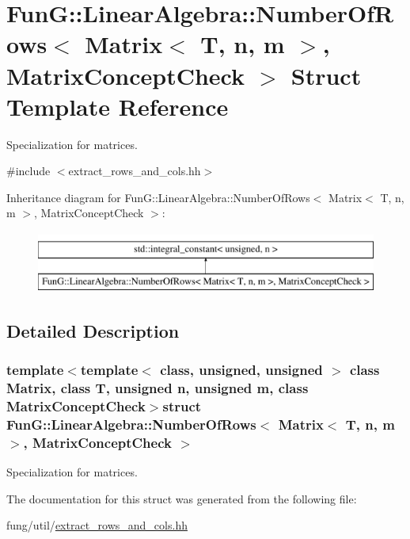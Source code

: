 \hypertarget{structFunG_1_1LinearAlgebra_1_1NumberOfRows_3_01Matrix_3_01T_00_01n_00_01m_01_4_00_01MatrixConceptCheck_01_4}{\section{\-Fun\-G\-:\-:\-Linear\-Algebra\-:\-:\-Number\-Of\-Rows$<$ \-Matrix$<$ \-T, n, m $>$, \-Matrix\-Concept\-Check $>$ \-Struct \-Template \-Reference}
\label{structFunG_1_1LinearAlgebra_1_1NumberOfRows_3_01Matrix_3_01T_00_01n_00_01m_01_4_00_01MatrixConceptCheck_01_4}
}


\-Specialization for matrices.  




{\ttfamily \#include $<$extract\-\_\-rows\-\_\-and\-\_\-cols.\-hh$>$}

\-Inheritance diagram for \-Fun\-G\-:\-:\-Linear\-Algebra\-:\-:\-Number\-Of\-Rows$<$ \-Matrix$<$ \-T, n, m $>$, \-Matrix\-Concept\-Check $>$\-:\begin{figure}[H]
\begin{center}
\leavevmode
\includegraphics[height=2.000000cm]{structFunG_1_1LinearAlgebra_1_1NumberOfRows_3_01Matrix_3_01T_00_01n_00_01m_01_4_00_01MatrixConceptCheck_01_4}
\end{center}
\end{figure}


\subsection{\-Detailed \-Description}
\subsubsection*{template$<$template$<$ class, unsigned, unsigned $>$ class \-Matrix, class T, unsigned n, unsigned m, class Matrix\-Concept\-Check$>$struct Fun\-G\-::\-Linear\-Algebra\-::\-Number\-Of\-Rows$<$ Matrix$<$ T, n, m $>$, Matrix\-Concept\-Check $>$}

\-Specialization for matrices. 

\-The documentation for this struct was generated from the following file\-:\begin{DoxyCompactItemize}
\item 
fung/util/\hyperlink{extract__rows__and__cols_8hh}{extract\-\_\-rows\-\_\-and\-\_\-cols.\-hh}\end{DoxyCompactItemize}
